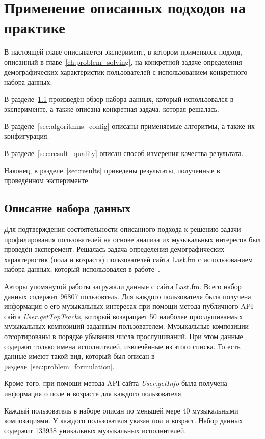 \chapter{Применение описанных подходов на практике}

В настоящей главе описывается эксперимент, в котором применялся
подход, описанный в главе~\ref{ch:problem_solving}, на
конкретной задаче определения демографических характеристик
пользователей с использованием конкретного набора данных.

В разделе~\ref{sec:dataset} произведён обзор набора данных,
который использовался в эксперименте, а также описана
конкретная задача, которая решалась.

В разделе~\ref{sec:algorithms_config} описаны применяемые
алгоритмы, а также их конфигурация.

В разделе~\ref{sec:result_quality} описан способ измерения
качества результата.

Наконец, в разделе~\ref{sec:results} приведены результаты,
полученные в проведённом эксперименте.

\section{Описание набора данных}
\label{sec:dataset}

Для подтверждения состоятельности описанного подхода к решению задачи
профилирования пользователей на основе анализа их музыкальных
интересов был проведён эксперемент. Решалась задача определения
демографических характеристик (пола и возраста) пользователей сайта 
Last.fm с использованием набора данных, который использовался в
работе~\cite{wu2014gender}.

Авторы упомянутой работы загружали данные с сайта Last.fm. Всего набор
данных содержит 96807 пользовтель. Для каждого пользователя была
получена информация о его музыкальных интересах при помощи метода
публичного API сайта \textit{User.getTopTracks}, который возвращает
50 наиболее прослушиваемых музыкальных композиций заданным пользователем. 
Музыкальные композиции отсортированы в порядке убывания числа прослушиваний.
При этом данные содержат только имена исполнителей, извлечённые из этого списка.
То есть данные имеют такой вид, который был описан в 
разделе~\ref{sec:problem_formulation}. 

Кроме того, при помощи метода API сайта \textit{User.getInfo}
была получена информация о поле и возрасте для каждого пользователя.

Каждый пользователь в наборе описан по меньшей мере 40
музыкальными композициями. У каждого пользователя указан пол и возраст.
Набор данных содержит 133938 уникальных музыкальных исполнителей.

